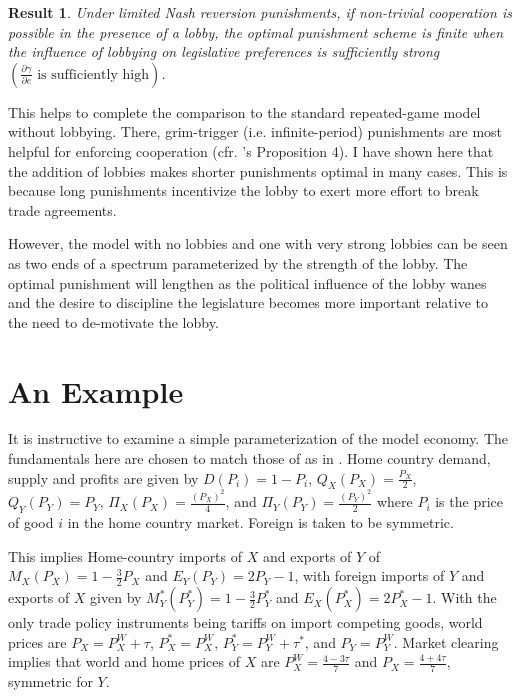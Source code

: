 \documentclass[authoryear, review]{elsarticle}
\newtheorem{result}{Result}
\newcommand{\ga}{\gamma}
\begin{document}
\begin{result}
  Under limited Nash reversion punishments, if non-trivial cooperation is possible in the presence of a lobby, the optimal punishment scheme is finite when the influence of lobbying on legislative preferences is sufficiently strong $\left(\frac{\partial \ga}{\partial e}\text{ is sufficiently high}\right)$.
	\label{res:3}
\end{result}
This helps to complete the comparison to the standard repeated-game model without lobbying. There, grim-trigger (i.e. infinite-period) punishments are most helpful for enforcing cooperation (cfr. \citet{krw}'s Proposition 4). I have shown here that the addition of lobbies makes shorter punishments optimal in many cases. This is because long punishments incentivize the lobby to exert more effort to break trade agreements.

However, the model with no lobbies and one with very strong lobbies can be seen as two ends of a spectrum parameterized by the strength of the lobby. The optimal punishment will lengthen as the political influence of the lobby wanes and the desire to discipline the legislature becomes more important relative to the need to de-motivate the lobby.



\section{An Example}
\label{sec:example}
It is instructive to examine a simple parameterization of the model economy. The fundamentals here are chosen to match those of \citet{bs2005} as in \citet{buzard2013b}. Home country demand, supply and profits are given by $D(P_i) = 1 - P_i$, $Q_X(P_X) = \frac{P_X}{2}$, $Q_Y(P_Y) = P_Y$, $\Pi_X(P_X) = \frac{(P_X)^2}{4}$, and $\Pi_Y(P_Y) = \frac{(P_Y)^2}{2}$ where $P_i$ is the price of good $i$ in the home country market. %
Foreign is taken to be symmetric.

This implies Home-country imports of $X$ and exports of $Y$ of $M_X(P_X)= 1 - \frac{3}{2}P_X$ and $E_Y(P_Y)= 2P_Y -1$, with foreign imports of $Y$ and exports of $X$ given by $M_Y^*(P_Y^*)= 1 - \frac{3}{2}P_Y^*$ and $E_X(P_X^*)= 2P_X^* -1$. With the only trade policy instruments being tariffs on import competing goods, world prices are $P_X = P_X^W + \tau$, $P_X^* = P_X^W$, $P_Y^* = P_Y^W + \tau^*$, and $P_Y = P_Y^W$. Market clearing implies that world and home prices of $X$ are $P_X^W = \frac{4-3\tau}{7}$ and $P_X = \frac{4+4\tau}{7}$, symmetric for $Y$. \\
\end{document}
